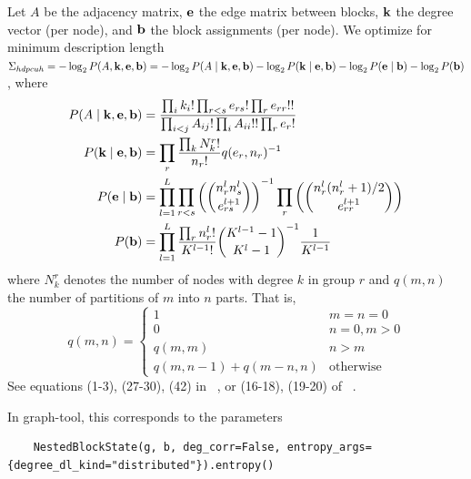 \documentclass[aps,pre,superscriptaddress]{article}
\begin{document}
Let $A$ be the adjacency matrix, $\vb{e}$ the edge matrix between blocks, $\vb{k}$ the degree vector (per node), and $\vb{b}$ the block assignments (per node).
We optimize for minimum description length $\Sigma_{hdpcuh} = -\log_2P(A, \vb{k}, \vb{e}, \vb{b}) = -\log_2P(A \mid \vb{k}, \vb{e}, \vb{b}) - \log_2 P(\vb{k} \mid \vb{e}, \vb{b}) - \log_2 P(\vb{e} \mid \vb{b}) - \log_2 P(\vb{b}) $, where
\begin{align}
	P(A \mid \vb{k}, \vb{e}, \vb{b}) & = \frac{ \prod_i k_i! \prod_{r < s} e_{rs}! \prod_{r} e_{rr}!!} {\prod_{i < j} A_{ij}! \prod_i A_{ii}!! \prod_r e_r!}                                      \\
	P(\vb{k} \mid \vb{e}, \vb{b})    & = \prod_r \frac{\prod_k N_k^r!}{n_r!} q(e_r, n_r)^{-1}                                                                                                     \\
	P(\vb{e} \mid \vb{b})            & = \prod_{l=1}^{L} \prod_{r < s} \left( \binom{n_r^l n_s^l}{e_{rs}^{l+1}} \right)^{-1} \prod_r \left( \binom{ n_r^l (n_r^l + 1) / 2 }{e_{rr}^{l+1} }\right) \\
	P(\vb{b})                        & = \prod_{l=1}^L \frac{\prod_r n_r^l!}{K^{l-1}!} \binom{ K^{l-1} - 1}{K^l - 1}^{-1} \frac{1}{K^{l-1}}
\end{align}
where $N_k^r$ denotes the number of nodes with degree $k$ in group $r$ and $q(m, n)$ the number of partitions of $m$ into $n$ parts.
That is,
\begin{equation}
	q(m, n) =
	\begin{cases}
		1                         & m = n = 0        \\
		0                         & n = 0, m > 0     \\
		q(m, m)                   & n > m            \\
		q(m, n - 1) + q(m - n, n) & \text{otherwise}
	\end{cases}
\end{equation}
See equations (1-3), (27-30), (42) in ~\cite{peixoto17-01}, or (16-18), (19-20) of ~\cite{funke19-04}.

In graph-tool, this corresponds to the parameters
\begin{verbatim}
    NestedBlockState(g, b, deg_corr=False, entropy_args={degree_dl_kind="distributed"}).entropy()
\end{verbatim}

\clearpage


\end{document}
